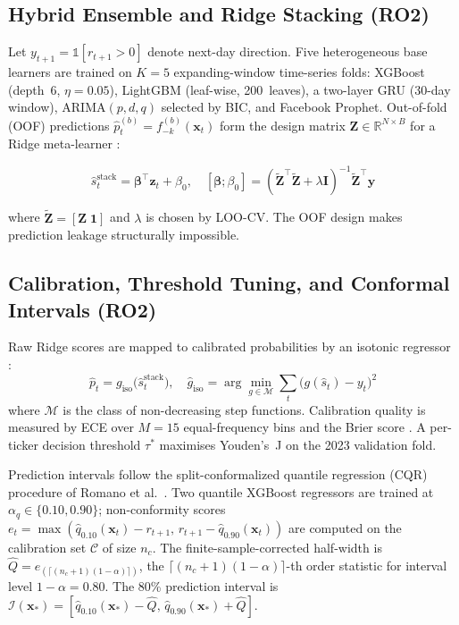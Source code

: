 \documentclass[12pt,a4paper]{article}
\begin{document}
\subsection{Hybrid Ensemble and Ridge Stacking (RO2)}

Let $y_{t+1}=\mathbb{1}[r_{t+1}>0]$ denote next-day direction. Five heterogeneous
base learners are trained on $K=5$ expanding-window time-series folds:
XGBoost \cite{r13} (depth~6, $\eta=0.05$), LightGBM \cite{r14} (leaf-wise,
200~leaves), a two-layer GRU \cite{r15} (30-day window), ARIMA$(p,d,q)$ selected
by BIC, and Facebook Prophet. Out-of-fold (OOF) predictions
$\hat{p}_t^{(b)}=f_{-k}^{(b)}(\mathbf{x}_t)$ form the design matrix
$\mathbf{Z}\!\in\!\mathbb{R}^{N\times B}$ for a Ridge meta-learner \cite{r16}:

\begin{equation}
\hat{s}_t^{\mathrm{stack}}=\boldsymbol{\beta}^{\!\top}\mathbf{z}_t+\beta_0,\quad
[\boldsymbol{\beta};\beta_0]=(\tilde{\mathbf{Z}}^{\!\top}\tilde{\mathbf{Z}}+\lambda\mathbf{I})^{-1}\tilde{\mathbf{Z}}^{\!\top}\mathbf{y}
\label{eq:stack}
\end{equation}

\noindent where $\tilde{\mathbf{Z}}=[\mathbf{Z}\;\mathbf{1}]$ and $\lambda$ is
chosen by LOO-CV. The OOF design makes prediction leakage structurally impossible.

\subsection{Calibration, Threshold Tuning, and Conformal Intervals (RO2)}

Raw Ridge scores are mapped to calibrated probabilities by an isotonic
regressor \cite{r17}:
\begin{equation}
\hat{p}_t=g_{\mathrm{iso}}\!\bigl(\hat{s}_t^{\mathrm{stack}}\bigr),\quad
\hat{g}_{\mathrm{iso}}=\arg\min_{g\in\mathcal{M}}\sum_t\!\bigl(g(\hat{s}_t)-y_t\bigr)^2
\label{eq:isotonic}
\end{equation}
where $\mathcal{M}$ is the class of non-decreasing step functions.
Calibration quality is measured by ECE over $M=15$ equal-frequency bins and the
Brier score \cite{r34}. A per-ticker decision threshold $\tau^*$ maximises
Youden's~J on the 2023 validation fold.

Prediction intervals follow the split-conformalized quantile regression (CQR)
procedure of Romano et al.\ \cite{r26}. Two quantile XGBoost regressors are
trained at $\alpha_q\!\in\!\{0.10,0.90\}$; non-conformity scores
$e_t=\max(\hat{q}_{0.10}(\mathbf{x}_t)-r_{t+1},\,r_{t+1}-\hat{q}_{0.90}(\mathbf{x}_t))$
are computed on the calibration set $\mathcal{C}$ of size $n_c$. The
finite-sample-corrected half-width is
$\hat{Q}=e_{(\lceil(n_c+1)(1-\alpha)\rceil)}$, the
$\lceil(n_c+1)(1-\alpha)\rceil$-th order statistic for interval
level $1-\alpha=0.80$. The 80\% prediction interval is
$\mathcal{I}(\mathbf{x}_*)=[\hat{q}_{0.10}(\mathbf{x}_*)-\hat{Q},\,\hat{q}_{0.90}(\mathbf{x}_*)+\hat{Q}]$.
\end{document}

